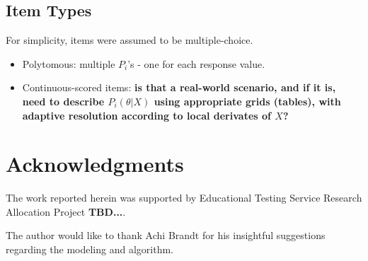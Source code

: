 \documentclass{article}
\newcommand{\ta}{\theta}
\begin{document}
\subsection{Item Types}
\label{item_types}
For simplicity, items were assumed to be multiple-choice.
\begin{itemize}
	\item Polytomous: multiple $P_i$'s - one for each response value.
	\item Continuous-scored items: {\bf is that a real-world scenario, and if it is, 
	need to describe $P_i(\ta|X)$ using appropriate grids (tables), with adaptive resolution
	according to local derivates of $X$?}
\end{itemize}

\section{Acknowledgments}
The work reported herein was supported by Educational Testing Service Research Allocation Project {\bf TBD...}.

The author would like to thank Achi Brandt for his insightful suggestions regarding the modeling and algorithm.



\end{document}

